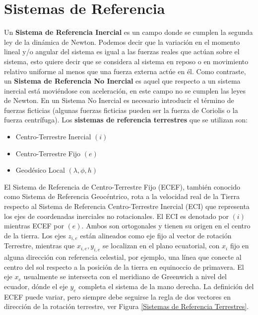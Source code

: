 \section{Sistemas de Referencia}

Un \textbf{Sistema de Referencia Inercial} es un campo donde se cumplen la segunda ley de la dinámica de Newton. Podemos decir que la variación en el momento lineal y/o angular del sistema es igual a las fuerzas reales que actúan sobre el sistema, esto quiere decir que se considera al sistema en reposo o en movimiento relativo uniforme al menos que una fuerza externa actúe en él. Como contraste, un \textbf{Sistema de Referencia No Inercial} es aquel que respecto a un sistema inercial está moviéndose con aceleración, en este campo no se cumplen las leyes de Newton. En un Sistema No Inercial es necesario introducir el término de fuerzas ficticias (algunas fuerzas ficticias pueden ser la fuerza de Coriolis o la fuerza centrífuga).
%
Los \textbf{sistemas de referencia terrestres} que se utilizan son: 
\begin{itemize}
    \item Centro-Terrestre Inercial $(i)$
    \item Centro-Terrestre Fijo $(e)$
    \item Geodésico Local $(\lambda, \phi, h)$
\end{itemize}
El Sistema de Referencia de Centro-Terrestre Fijo (ECEF), también conocido como Sistema de Referencia Geocéntrico, rota a la velocidad real de la Tierra respecto al Sistema de Referencia Centro-Terrestre Inercial (ECI) que representa los ejes de coordenadas inerciales no rotacionales. 
El ECI es denotado por $(i)$ mientras ECEF por $(e)$. Ambos son ortogonales y tienen su origen en el centro de la tierra. 
Los ejes $z_{i,e}$ están alineados como eje fijo al vector de rotación Terrestre, mientras que $x_{i,e}, y_{i,e}$ se localizan en el plano ecuatorial, con $x_i$ fijo en alguna dirección con referencia celestial, por ejemplo, una línea que conecte al centro del sol respecto a la posición de la tierra en equinoccio de primavera. 
El eje $x_e$ usualmente se intersecta con el meridiano de Greenwich a nivel del ecuador, dónde el eje $y_e$ completa el sistema de la mano derecha. 
La definición del ECEF puede variar, pero siempre debe seguirse la regla de dos vectores en dirección de la rotación terrestre, ver Figura \ref{Sistemas de Referencia Terrestres}.
  
